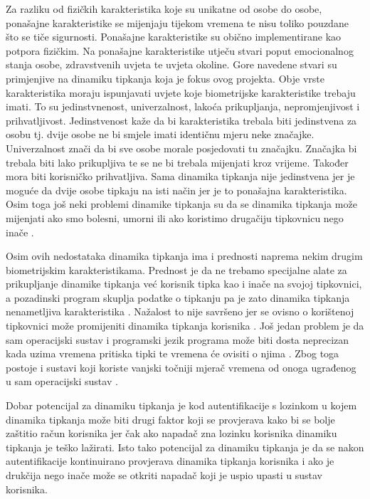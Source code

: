 \documentclass[]{foi}
\begin{document}
Za razliku od fizičkih karakteristika koje su unikatne od osobe do osobe, ponašajne karakteristike se mijenjaju tijekom vremena te nisu toliko pouzdane što se tiče sigurnosti. Ponašajne karakteristike su obično implementirane kao potpora fizičkim. Na ponašajne karakteristike utječu stvari poput emocionalnog stanja osobe, zdravstvenih uvjeta te uvjeta okoline. Gore navedene stvari su primjenjive na dinamiku tipkanja koja je fokus ovog projekta. Obje vrste karakteristika moraju ispunjavati uvjete koje biometrijske karakteristike trebaju imati. To su jedinstvnenost, univerzalnost, lakoća prikupljanja, nepromjenjivost i prihvatljivost.\cite{Kasprowski2022} Jedinstvenost kaže da bi karakteristika trebala biti jedinstvena za osobu tj. dvije osobe ne bi smjele imati identičnu mjeru neke značajke. Univerzalnost znači da bi sve osobe morale posjedovati tu značajku. Značajka bi trebala biti lako prikupljiva te se ne bi trebala mijenjati kroz vrijeme. Također mora biti korisničko prihvatljiva. Sama dinamika tipkanja nije jedinstvena jer je moguće da dvije osobe tipkaju na isti način jer je to ponašajna karakteristika. Osim toga još neki problemi dinamike tipkanja su da se dinamika tipkanja može mijenjati ako smo bolesni, umorni ili ako koristimo drugačiju tipkovnicu nego inače \cite{Chang2021}. 

Osim ovih nedostataka dinamika tipkanja ima i prednosti naprema nekim drugim biometrijskim karakteristikama. Prednost je da ne trebamo specijalne alate za prikupljanje dinamike tipkanja već korisnik tipka kao i inače na svojoj tipkovnici, a pozadinski program skuplja podatke o tipkanju pa je zato dinamika tipkanja nenametljiva karakteristika \cite{Chang2021}. Nažalost to nije savršeno jer se ovisno o korištenoj tipkovnici može promijeniti dinamika tipkanja korisnika \cite{Granic2012}. Još jedan problem je da sam operacijski sustav i programski jezik programa može biti dosta neprecizan kada uzima vremena pritiska tipki te vremena će ovisiti o njima \cite{Granic2012}. Zbog toga postoje i sustavi koji koriste vanjski točniji mjerač vremena od onoga ugrađenog u sam operacijski sustav \cite{Granic2012}.

Dobar potencijal za dinamiku tipkanja je kod autentifikacije s lozinkom u kojem dinamika tipkanja može biti drugi faktor koji se provjerava kako bi se bolje zaštitio račun korisnika jer čak ako napadač zna lozinku korisnika dinamiku tipkanja je teško lažirati. Isto tako potencijal za dinamiku tipkanja je da se nakon autentifikacije kontinuirano provjerava dinamika tipkanja korisnika i ako je drukčija nego inače može se otkriti napadač koji je uspio upasti u sustav korisnika.
\end{document}
